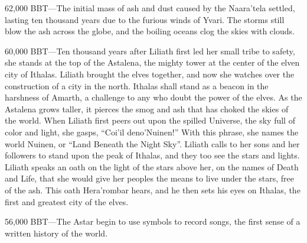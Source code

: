 \documentclass[smalldemyvopaper,11pt,twoside,onecolumn,openright,extrafontsizes]{memoir}
\begin{document}
62,000 BBT—The initial mass of ash and dust caused by the Naara’tela settled, lasting ten thousand years due to the furious winds of Yvari. The storms still blow the ash across the globe, and the boiling oceans clog the skies with clouds.

60,000 BBT—Ten thousand years after Liliath first led her small tribe to safety, she stands at the top of the Astalena, the mighty tower at the center of the elven city of Ithalas. Liliath brought the elves together, and now she watches over the construction of a city in the north. Ithalas shall stand as a beacon in the harshness of Amarth, a challenge to any who doubt the power of the elves. As the Astalena grows taller, it pierces the smog and ash that has choked the skies of the world. When Liliath first peers out upon the spilled Universe, the sky full of color and light, she gasps, “Coi’il deno’Nuinen!” With this phrase, she names the world Nuinen, or “Land Beneath the Night Sky”. Liliath calls to her sons and her followers to stand upon the peak of Ithalas, and they too see the stars and lights. Liliath speaks an oath on the light of the stars above her, on the names of Death and Life, that she would give her peoples the means to live under the stars, free of the ash. This oath Hera’rombar hears, and he then sets his eyes on Ithalas, the first and greatest city of the elves.

56,000 BBT—The Astar begin to use symbols to record songs, the first sense of a written history of the world.
\end{document}
